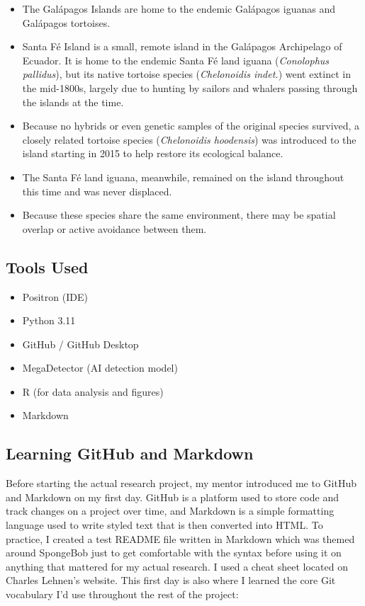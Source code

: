 \documentclass[
  letterpaper,
  DIV=11,
  numbers=noendperiod]{scrartcl}
\providecommand{\tightlist}{%
  \setlength{\itemsep}{0pt}\setlength{\parskip}{0pt}}
\begin{document}
\begin{itemize}
\tightlist
\item
  The Galápagos Islands are home to the endemic Galápagos iguanas and
  Galápagos tortoises.
\item
  Santa Fé Island is a small, remote island in the Galápagos Archipelago
  of Ecuador. It is home to the endemic Santa Fé land iguana
  (\emph{Conolophus pallidus}), but its native tortoise species
  (\emph{Chelonoidis indet.}) went extinct in the mid-1800s, largely due
  to hunting by sailors and whalers passing through the islands at the
  time.
\item
  Because no hybrids or even genetic samples of the original species
  survived, a closely related tortoise species (\emph{Chelonoidis
  hoodensis}) was introduced to the island starting in 2015 to help
  restore its ecological balance.
\item
  The Santa Fé land iguana, meanwhile, remained on the island throughout
  this time and was never displaced.
\item
  Because these species share the same environment, there may be spatial
  overlap or active avoidance between them.
\end{itemize}

\subsection{Tools Used}\label{tools-used}

\begin{itemize}
\tightlist
\item
  Positron (IDE)
\item
  Python 3.11
\item
  GitHub / GitHub Desktop
\item
  MegaDetector (AI detection model)
\item
  R (for data analysis and figures)
\item
  Markdown
\end{itemize}

\subsection{Learning GitHub and
Markdown}\label{learning-github-and-markdown}

Before starting the actual research project, my mentor introduced me to
GitHub and Markdown on my first day. GitHub is a platform used to store
code and track changes on a project over time, and Markdown is a simple
formatting language used to write styled text that is then converted
into HTML. To practice, I created a test README file written in Markdown
which was themed around SpongeBob just to get comfortable with the
syntax before using it on anything that mattered for my actual research.
I used a cheat sheet located on Charles Lehnen's website. This first day
is also where I learned the core Git vocabulary I'd use throughout the
rest of the project:
\end{document}
